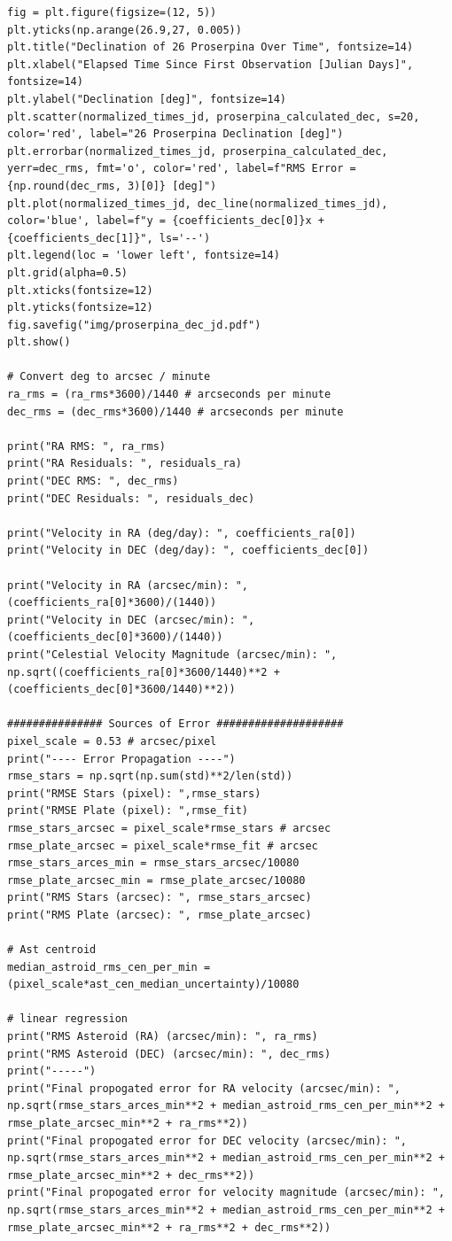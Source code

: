 \documentclass{article}
\begin{document}
\begin{appendices}
\begin{small}
\begin{verbatim}
fig = plt.figure(figsize=(12, 5))
plt.yticks(np.arange(26.9,27, 0.005))
plt.title("Declination of 26 Proserpina Over Time", fontsize=14)
plt.xlabel("Elapsed Time Since First Observation [Julian Days]", fontsize=14)
plt.ylabel("Declination [deg]", fontsize=14)
plt.scatter(normalized_times_jd, proserpina_calculated_dec, s=20, color='red', label="26 Proserpina Declination [deg]")
plt.errorbar(normalized_times_jd, proserpina_calculated_dec, yerr=dec_rms, fmt='o', color='red', label=f"RMS Error = {np.round(dec_rms, 3)[0]} [deg]")
plt.plot(normalized_times_jd, dec_line(normalized_times_jd), color='blue', label=f"y = {coefficients_dec[0]}x + {coefficients_dec[1]}", ls='--')
plt.legend(loc = 'lower left', fontsize=14)
plt.grid(alpha=0.5)
plt.xticks(fontsize=12)
plt.yticks(fontsize=12)
fig.savefig("img/proserpina_dec_jd.pdf")
plt.show()

# Convert deg to arcsec / minute
ra_rms = (ra_rms*3600)/1440 # arcseconds per minute
dec_rms = (dec_rms*3600)/1440 # arcseconds per minute

print("RA RMS: ", ra_rms)
print("RA Residuals: ", residuals_ra)
print("DEC RMS: ", dec_rms)
print("DEC Residuals: ", residuals_dec)

print("Velocity in RA (deg/day): ", coefficients_ra[0])
print("Velocity in DEC (deg/day): ", coefficients_dec[0])

print("Velocity in RA (arcsec/min): ", (coefficients_ra[0]*3600)/(1440))
print("Velocity in DEC (arcsec/min): ", (coefficients_dec[0]*3600)/(1440))
print("Celestial Velocity Magnitude (arcsec/min): ", np.sqrt((coefficients_ra[0]*3600/1440)**2 + (coefficients_dec[0]*3600/1440)**2))

############### Sources of Error ####################
pixel_scale = 0.53 # arcsec/pixel
print("---- Error Propagation ----")
rmse_stars = np.sqrt(np.sum(std)**2/len(std))
print("RMSE Stars (pixel): ",rmse_stars)
print("RMSE Plate (pixel): ",rmse_fit)
rmse_stars_arcsec = pixel_scale*rmse_stars # arcsec
rmse_plate_arcsec = pixel_scale*rmse_fit # arcsec
rmse_stars_arces_min = rmse_stars_arcsec/10080
rmse_plate_arcsec_min = rmse_plate_arcsec/10080
print("RMS Stars (arcsec): ", rmse_stars_arcsec)
print("RMS Plate (arcsec): ", rmse_plate_arcsec)

# Ast centroid
median_astroid_rms_cen_per_min = (pixel_scale*ast_cen_median_uncertainty)/10080

# linear regression 
print("RMS Asteroid (RA) (arcsec/min): ", ra_rms)
print("RMS Asteroid (DEC) (arcsec/min): ", dec_rms)
print("-----")
print("Final propogated error for RA velocity (arcsec/min): ", np.sqrt(rmse_stars_arces_min**2 + median_astroid_rms_cen_per_min**2 + rmse_plate_arcsec_min**2 + ra_rms**2))
print("Final propogated error for DEC velocity (arcsec/min): ", np.sqrt(rmse_stars_arces_min**2 + median_astroid_rms_cen_per_min**2 + rmse_plate_arcsec_min**2 + dec_rms**2))
print("Final propogated error for velocity magnitude (arcsec/min): ", np.sqrt(rmse_stars_arces_min**2 + median_astroid_rms_cen_per_min**2 + rmse_plate_arcsec_min**2 + ra_rms**2 + dec_rms**2))
\end{verbatim}
\end{small}

\end{appendices}
\end{document}
